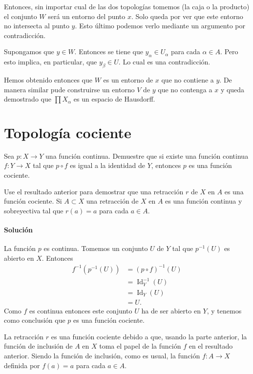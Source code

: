 \documentclass[a5paper,10pt,final]{extarticle}
\DeclareMathOperator{\Id}{Id}
\let\footnote\null
\begin{document}
Entonces, sin importar cual de las dos topologías tomemos (la caja o la producto)
el conjunto $W$ será un entorno del punto $x$. Solo queda por ver que este entorno
no intersecta al punto $y$. Esto último podemos verlo mediante un argumento por
contradicción.

Supongamos que $y\in W$. Entonces se tiene que $y_\alpha\in U_\alpha$ para cada $\alpha\in A$.
Pero esto implica, en particular, que $y_{\beta}\in U$.
Lo cual es una contradicción.

Hemos obtenido entonces que $W$ es un entorno de $x$ que no contiene a $y$.
De manera similar pude construirse un entorno $V$ de $y$ que no contenga a $x$
y queda demostrado que $\prod X_\alpha$ es un espacio de Hausdorff.

\section{Topología cociente}\label{sec:cociente}

Sea $p\colon X\to Y$ una función continua. Demuestre que si existe una función continua $f\colon Y\to X$ tal que $p\circ f$ es igual a la identidad de $Y$, entonces $p$ es una función cociente.

Use el resultado anterior para demostrar que una retracción  $r$ de $X$ en $A$ es una función cociente. Si $A\subset X$ una retracción de $X$ en $A$ es una función continua y sobreyectiva tal que $r(a)=a$ para cada $a\in A$.\footnote{Ejercicio tomado del Munkres \cite[\S22, Nº 2]{munkres_topology_2014}}

\paragraph{Solución}

La función $p$ es continua. Tomemos un conjunto $U$ de $Y$ tal que $p^{-1}(U)$ es abierto en $X$. Entonces
\begin{align*}
	f^{-1}(p^{-1}(U)) &= (p\circ f)^{-1}(U) \\
					  &= \Id_Y^{-1}(U)\\
					  &= \Id_Y(U)\\
					  &= U.
\end{align*}
Como $f$ es continua entonces este conjunto $U$ ha de ser abierto en $Y$, y tenemos como conclusión que $p$ es una función cociente.

La retracción $r$ es una función cociente debido a que, usando la parte anterior, la función de inclusión de $A$ en $X$ toma el papel de la función $f$ en el resultado anterior. Siendo la función de inclusión, como es usual, la función $f\colon A\to X$ definida por $f(a)=a$ para cada $a\in A$.
\end{document}
